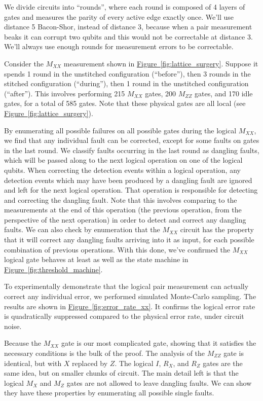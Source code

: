 \documentclass[onecolumn,unpublished,a4paper]{quantumarticle}
\theoremstyle{definition}
\theoremstyle{definition}
\theoremstyle{definition}
\newcommand{\fig}[1]{\hyperref[fig:#1]{Figure~\ref*{fig:#1}}}
\begin{document}
We divide circuits into ``rounds'', where each round is composed of 4 layers of gates and measures the parity of every active edge exactly once.
We'll use distance 5 Bacon-Shor, instead of distance 3, because when a pair measurement beaks it can corrupt two qubits and this would not be correctable at distance 3.
We'll always use enough rounds for measurement errors to be correctable.

Consider the $M_{XX}$ measurement shown in \fig{lattice_surgery}.
Suppose it spends 1 round in the unstitched configuration (``before''), then 3 rounds in the stitched configuration (``during''), then 1 round in the unstitched configuration (``after'').
This involves performing 215 $M_{XX}$ gates, 200 $M_{ZZ}$ gates, and 170 idle gates, for a total of 585 gates.
Note that these physical gates are all local (see \fig{lattice_surgery}).

By enumerating all possible failures on all possible gates during the logical $M_{XX}$, we find that any individual fault can be corrected, except for some faults on gates in the last round.
We classify faults occurring in the last round as dangling faults, which will be passed along to the next logical operation on one of the logical qubits.
When correcting the detection events within a logical operation, any detection events which may have been produced by a dangling fault are ignored and left for the next logical operation.
That operation is responsible for detecting and correcting the dangling fault.
Note that this involves comparing to the measurements at the end of this operation (the previous operation, from the perspective of the next operation) in order to detect and correct any dangling faults.
We can also check by enumeration that the $M_{XX}$ circuit has the property that it will correct any dangling faults arriving into it as input, for each possible combination of previous operations.
With this done, we've confirmed the $M_{XX}$ logical gate behaves at least as well as the state machine in \fig{threshold_machine}.

To experimentally demonstrate that the logical pair measurement can actually correct any individual error, we performed simulated Monte-Carlo sampling.
The results are shown in \fig{error_rate_xx}.
It confirms the logical error rate is quadratically suppressed compared to the physical error rate, under circuit noise.

Because the $M_{XX}$ gate is our most complicated gate, showing that it satisfies the necessary conditions is the bulk of the proof.
The analysis of the $M_{ZZ}$ gate is identical, but with $X$ replaced by $Z$.
The logical $I$, $R_X$, and $R_Z$ gates are the same idea, but on smaller chunks of circuit.
The main detail left is that the logical $M_X$ and $M_Z$ gates are not allowed to leave dangling faults.
We can show they have these properties by enumerating all possible single faults.
\end{document}
